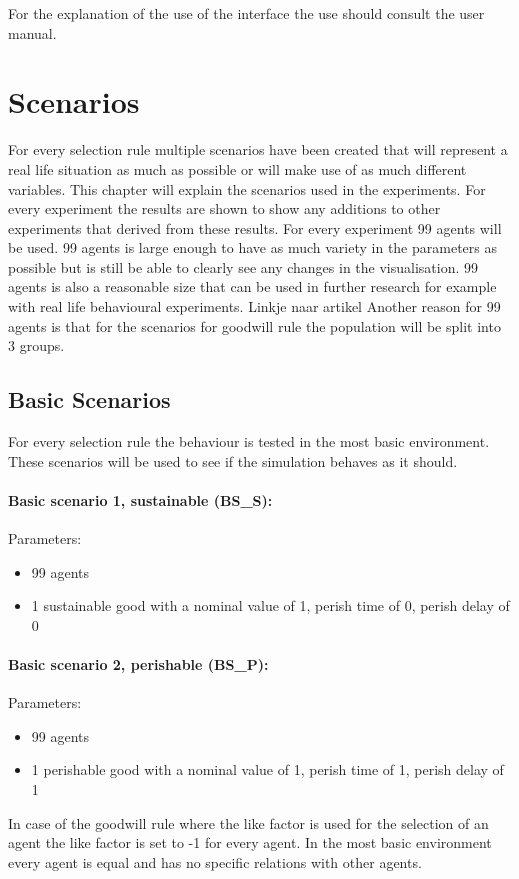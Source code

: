 \documentclass[twoside,openright]{uva-bachelor-thesis}
\begin{document}
For the explanation of the use of the interface the use should consult the user manual.


\chapter{Scenarios}
For every selection rule multiple scenarios have been created that will represent a real life situation as much as possible or will make use of as much different variables.  This chapter will explain the scenarios used in the experiments. For every experiment the results are shown to show any additions to other experiments that derived from these results.
For every experiment 99 agents will be used. 99 agents is large enough to have as much variety in the parameters as possible but is still be able to clearly see any changes in the visualisation. 99 agents is also a reasonable size that can be used in further research for example with real life behavioural experiments. Linkje naar artikel Another reason for 99 agents is that for the scenarios for goodwill rule the population will be split into 3 groups.

\section{Basic Scenarios}
For every selection rule the behaviour is tested in the most basic environment. These scenarios will be used to see if the simulation behaves as it should.
\subsubsection{Basic scenario 1, sustainable (BS\_S):}
Parameters:
\begin{itemize}
\item	99 agents
\item	1 sustainable good with a nominal value of 1, perish time of 0, perish delay of 0
\end{itemize}
\subsubsection{Basic scenario 2, perishable (BS\_P):}
Parameters:
\begin{itemize}
\item	99 agents
\item	1 perishable good with a nominal value of 1, perish time of 1, perish delay of 1
\end{itemize}
In case of the goodwill rule where the like factor is used for the selection of an agent the like factor is set to -1 for every agent. In the most basic environment every agent is equal and has no specific relations with other agents.
\end{document}
